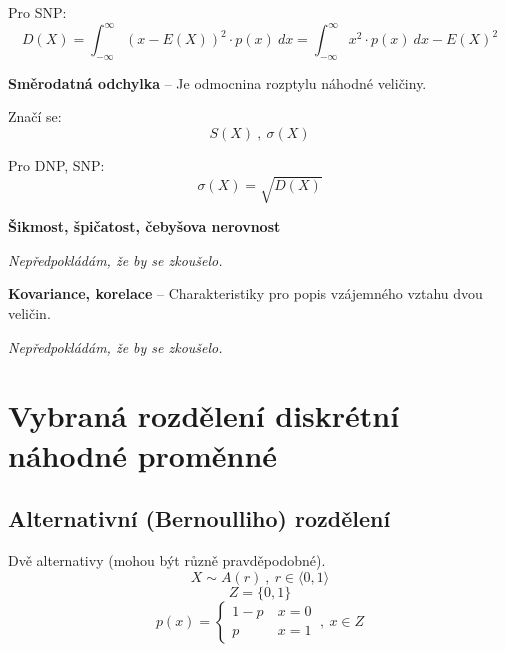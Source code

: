\begin{compactitem}
\begin{compactitem}
        \item Pro SNP:
        $$ D(X) = \int_{-\infty}^\infty {\left( x - E(X) \right)}^2 \cdot p(x) ~ dx = \int_{-\infty}^\infty x^2 \cdot p(x) ~ dx - E(X)^2 $$
    \end{compactitem}

    \item \textbf{Směrodatná odchylka} -- Je odmocnina rozptylu náhodné veličiny. \begin{compactitem}
        \item Značí se:
        $$ S(X) ~,~ \sigma(X) $$

        \item Pro DNP, SNP:
        $$ \sigma(X) = \sqrt{D(X)} $$
    \end{compactitem}

    \item \textbf{Šikmost, špičatost, čebyšova nerovnost} \begin{compactitem}
        \item \textit{Nepředpokládám, že by se zkoušelo.}
    \end{compactitem}

    \item \textbf{Kovariance, korelace} -- Charakteristiky pro popis vzájemného vztahu dvou veličin. \begin{compactitem}
        \item \textit{Nepředpokládám, že by se zkoušelo.}
    \end{compactitem}
\end{compactitem}


\section{Vybraná rozdělení diskrétní náhodné proměnné}

\subsection{Alternativní (Bernoulliho) rozdělení}

\begin{compactitem}
    \item Dvě alternativy (mohou být různě pravděpodobné).
    $$ X \sim A(r) ~,~ r \in \langle 0, 1 \rangle $$
    $$ Z = \{ 0, 1 \}$$
    $$ p(x) = \left\{
        \begin{array}{ll}
            1-p ~ & x = 0 \\
            p   ~ & x = 1
        \end{array}
        \right. ~,~ x \in Z
    $$
\end{compactitem}

